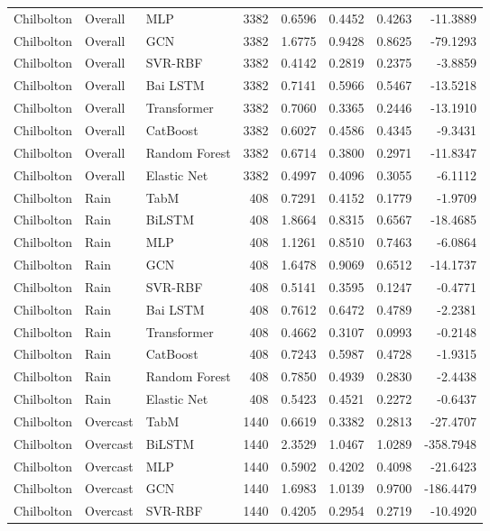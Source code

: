 \begin{longtable}{lllrrrrr}
Chilbolton & Overall & MLP & 3382 & 0.6596 & 0.4452 & 0.4263 & -11.3889 \\
Chilbolton & Overall & GCN & 3382 & 1.6775 & 0.9428 & 0.8625 & -79.1293 \\
Chilbolton & Overall & SVR-RBF & 3382 & 0.4142 & 0.2819 & 0.2375 & -3.8859 \\
Chilbolton & Overall & Bai LSTM & 3382 & 0.7141 & 0.5966 & 0.5467 & -13.5218 \\
Chilbolton & Overall & Transformer & 3382 & 0.7060 & 0.3365 & 0.2446 & -13.1910 \\
Chilbolton & Overall & CatBoost & 3382 & 0.6027 & 0.4586 & 0.4345 & -9.3431 \\
Chilbolton & Overall & Random Forest & 3382 & 0.6714 & 0.3800 & 0.2971 & -11.8347 \\
Chilbolton & Overall & Elastic Net & 3382 & 0.4997 & 0.4096 & 0.3055 & -6.1112 \\
\midrule
Chilbolton & Rain & TabM & 408 & 0.7291 & 0.4152 & 0.1779 & -1.9709 \\
Chilbolton & Rain & BiLSTM & 408 & 1.8664 & 0.8315 & 0.6567 & -18.4685 \\
Chilbolton & Rain & MLP & 408 & 1.1261 & 0.8510 & 0.7463 & -6.0864 \\
Chilbolton & Rain & GCN & 408 & 1.6478 & 0.9069 & 0.6512 & -14.1737 \\
Chilbolton & Rain & SVR-RBF & 408 & 0.5141 & 0.3595 & 0.1247 & -0.4771 \\
Chilbolton & Rain & Bai LSTM & 408 & 0.7612 & 0.6472 & 0.4789 & -2.2381 \\
Chilbolton & Rain & Transformer & 408 & 0.4662 & 0.3107 & 0.0993 & -0.2148 \\
Chilbolton & Rain & CatBoost & 408 & 0.7243 & 0.5987 & 0.4728 & -1.9315 \\
Chilbolton & Rain & Random Forest & 408 & 0.7850 & 0.4939 & 0.2830 & -2.4438 \\
Chilbolton & Rain & Elastic Net & 408 & 0.5423 & 0.4521 & 0.2272 & -0.6437 \\
\midrule
Chilbolton & Overcast & TabM & 1440 & 0.6619 & 0.3382 & 0.2813 & -27.4707 \\
Chilbolton & Overcast & BiLSTM & 1440 & 2.3529 & 1.0467 & 1.0289 & -358.7948 \\
Chilbolton & Overcast & MLP & 1440 & 0.5902 & 0.4202 & 0.4098 & -21.6423 \\
Chilbolton & Overcast & GCN & 1440 & 1.6983 & 1.0139 & 0.9700 & -186.4479 \\
Chilbolton & Overcast & SVR-RBF & 1440 & 0.4205 & 0.2954 & 0.2719 & -10.4920 \\

\end{longtable}
